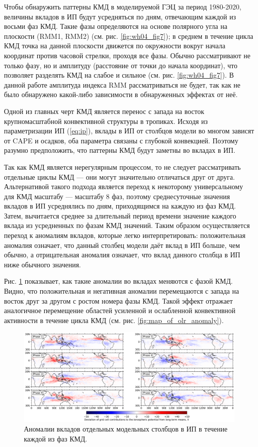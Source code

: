 
Чтобы обнаружить паттерны КМД в моделируемой ГЭЦ за период 1980-2020, величины вкладов в ИП будут усредняться по дням, отвечающим каждой из восьми фаз КМД. Такие фазы определяются на основе полярного угла на плоскости (RMM1, RMM2) (см. рис. \ref{fig:wh04_fig7}); в среднем в течение цикла КМД точка на данной плоскости движется по окружности вокруг начала координат против часовой стрелки, проходя все фазы. Обычно рассматривают не только фазу, но и амплитуду (расстояние от точки до начала координат), что позволяет разделять КМД на слабое и сильное (см. рис. \ref{fig:wh04_fig7}). В данной работе амплитуда индекса RMM рассматриваться не будет, так как не было обнаружено какой-либо зависимости в обнаруженных эффектах от неё.

Одной из главных черт КМД является перенос с запада на восток крупномасштабной конвективной структуры в тропиках. Исходя из параметризации ИП (\ref{eq:ip}), вклады в ИП от столбцов модели во многом зависят от CAPE и осадков, оба параметра связаны с глубокой конвекцией. Поэтому разумно предположить, что паттерны КМД будут заметны во вкладах в ИП.

Так как КМД является нерегулярным процессом, то не следует рассматривать отдельные циклы КМД --- они могут значительно отличаться друг от друга. Альтернативой такого подхода является переход к некоторому универсальному для КМД масштабу --- масштабу 8 фаз, поэтому среднесуточные значения вкладов в ИП усреднялись по дням, приходящимся на каждую из фаз КМД. Затем, вычитается среднее за длительный период времени значение каждого вклада из усредненных по фазам КМД значений. Таким образом осуществляется переход к аномалиям вкладов, которые легко интерпретировать: положительная аномалия означает, что данный столбец модели даёт вклад в ИП больше, чем обычно, а отрицательная аномалия означает, что вклад данного столбца в ИП ниже обычного значения.

Рис. \ref{fig:map_of_contributions} показывает, как такие аномалии во вкладах меняются с фазой КМД. Видно, что положительная и негативная аномалии перемещаются с запада на восток друг за другом с ростом номера фазы КМД. Такой эффект отражает аналогичное перемещение областей усиленной и ослабленной конвективной активности в течение цикла КМД (см. рис. \ref{fig:map_of_olr_anomaly}).

\begin{figure}[tb]
	\centering
	\includegraphics[width=\textwidth]{figures/map_of_contributions.png}
	\caption{Аномалии вкладов отдельных модельных столбцов в ИП в течение каждой из фаз КМД.}
	\label{fig:map_of_contributions}
\end{figure}

